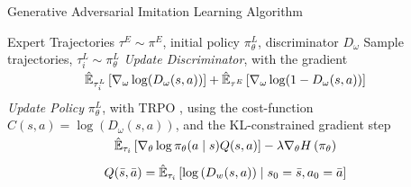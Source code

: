 \begin{algorithm}[tb]
\caption{Generative Adversarial Imitation Learning Algorithm}\label{alg:gail}
\begin{algorithmic}
\REQUIRE Expert Trajectories $\tau^{E} \sim \pi^{E}$, initial policy $\pi^{L}_{\theta}$, discriminator $D_{\omega}$
    \STATE Sample trajectories, $\tau^{L}_{i} \sim \pi^{L}_{\theta}$
    \STATE \textit{Update Discriminator}, with the gradient \\ $\vcenter{\begin{equation*}\mathbb{\hat{E}}_{\tau^{L}_{i}}\left [\nabla_{\omega} \log(D_{\omega}(s,a))\right ] +\mathbb{\hat{E}}_{\tau^{E}}\left [\nabla_{\omega} \log(1 - D_{\omega}(s,a))\right ]\end{equation*}}$
    \STATE \textit{Update Policy} $\pi_{\theta}^{L}$, with TRPO \cite{schulman2015trpo}, using the cost-function $C(s,a)=\log(D_{\omega}(s,a))$, and the KL-constrained gradient step 
   $\vcenter{\begin{equation*}\hat{\mathbb{E}}_{\tau_i}\left[\nabla_\theta \log \pi_\theta(a \mid s) Q(s, a)\right]-\lambda \nabla_\theta H\left(\pi_\theta\right) \end{equation*}}$ 
   $\vcenter{\begin{equation*}Q(\bar{s}, \bar{a})=\hat{\mathbb{E}}_{\tau_i}\left[\log \left(D_{w}(s, a)\right) \mid s_0=\bar{s}, a_0=\bar{a}\right]\end{equation*}}$
\ENDFOR
\end{algorithmic}
\end{algorithm}